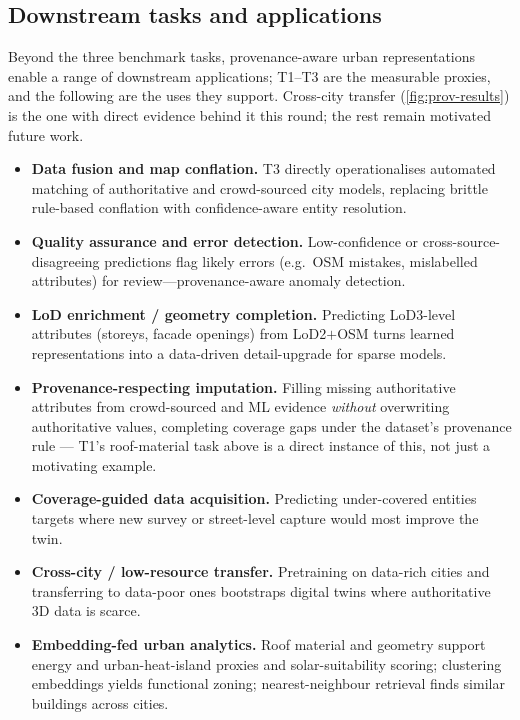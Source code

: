 \subsection{Downstream tasks and applications}
\label{sec:repL:downstream}
Beyond the three benchmark tasks, provenance-aware urban representations enable a
range of downstream applications; T1--T3 are the measurable proxies, and the
following are the uses they support. Cross-city transfer (\cref{fig:prov-results})
is the one with direct evidence behind it this round; the rest remain
motivated future work.

\begin{itemize}
  \item \textbf{Data fusion and map conflation.} T3 directly operationalises
  automated matching of authoritative and crowd-sourced city models, replacing
  brittle rule-based conflation with confidence-aware entity resolution.
  \item \textbf{Quality assurance and error detection.} Low-confidence or
  cross-source-disagreeing predictions flag likely errors (e.g.\ OSM mistakes,
  mislabelled attributes) for review---provenance-aware anomaly detection.
  \item \textbf{LoD enrichment / geometry completion.} Predicting LoD3-level
  attributes (storeys, facade openings) from LoD2$+$OSM turns learned
  representations into a data-driven detail-upgrade for sparse models.
  \item \textbf{Provenance-respecting imputation.} Filling missing authoritative
  attributes from crowd-sourced and ML evidence \emph{without} overwriting
  authoritative values, completing coverage gaps under the dataset's provenance
  rule --- T1's roof-material task above is a direct instance of this, not just
  a motivating example.
  \item \textbf{Coverage-guided data acquisition.} Predicting under-covered
  entities targets where new survey or street-level capture would most improve
  the twin.
  \item \textbf{Cross-city / low-resource transfer.} Pretraining on data-rich
  cities and transferring to data-poor ones bootstraps digital twins where
  authoritative 3D data is scarce.
  \item \textbf{Embedding-fed urban analytics.} Roof material and geometry
  support energy and urban-heat-island proxies and solar-suitability scoring;
  clustering embeddings yields functional zoning; nearest-neighbour retrieval
  finds similar buildings across cities.
\end{itemize}

